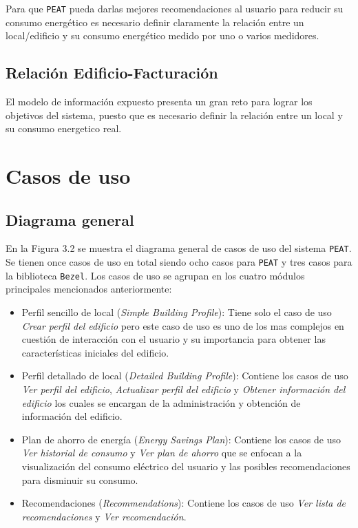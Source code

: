 Para que \texttt{PEAT} pueda darlas mejores recomendaciones al usuario para reducir su consumo
energético es necesario definir claramente la relación entre un local/edificio y su consumo
energético medido por uno o varios medidores.

\subsection{Relación Edificio-Facturación}
El modelo de información expuesto presenta un gran reto para lograr los objetivos del sistema,
puesto que es necesario definir la relación entre un local y su consumo energetico real.

\section{Casos de uso}

\subsection{Diagrama general}

En la Figura 3.2 se muestra el diagrama general de casos de uso del sistema
\texttt{PEAT}. Se tienen once casos de uso en total siendo ocho casos para
\texttt{PEAT} y tres casos para la biblioteca \texttt{Bezel}.
Los casos de uso se agrupan en los cuatro módulos principales mencionados
anteriormente:

\begin{itemize}
\item Perfil sencillo de local (\textit{Simple Building Profile}): Tiene
  solo el caso de uso \textit{Crear perfil del edificio} pero este caso de uso
  es uno de los mas complejos en cuestión de interacción con el usuario y su
  importancia para obtener las características iniciales del edificio.
\item Perfil detallado de local (\textit{Detailed Building Profile}): Contiene
  los casos de uso \textit{Ver perfil del edificio},
  \textit{Actualizar perfil del edificio} y \textit{Obtener información del edificio}
  los cuales se encargan de la administración y obtención de información del
  edificio.
\item Plan de ahorro de energía (\textit{Energy Savings Plan}): Contiene los
  casos de uso \textit{Ver historial de consumo} y \textit{Ver plan de ahorro}
  que se enfocan a la visualización del consumo eléctrico del usuario y las
  posibles recomendaciones para disminuir su consumo.
\item Recomendaciones (\textit{Recommendations}): Contiene los casos de uso
  \textit{Ver lista de recomendaciones} y \textit{Ver recomendación}.
\end{itemize}

